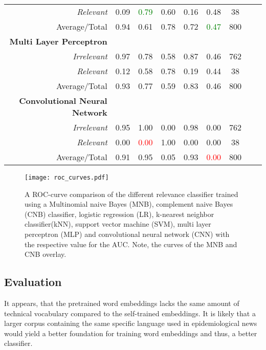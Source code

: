 \begin{table}
\begin{tabular}{@{}rcccccccc@{}}
      \textsl{Relevant}& 0.09& \textcolor{green}{0.79}&  0.60& 0.16& 0.48& 38 \\
      Average/Total& 0.94& 0.61& 0.78& 0.72& \textcolor{green}{0.47}& 800 \vspace{2mm}\\
      \textbf{Multi Layer Perceptron}\\
      \textsl{Irrelevant}& 0.97& 0.78&  0.58& 0.87& 0.46& 762 \\
      \textsl{Relevant}& 0.12& 0.58&  0.78& 0.19& 0.44& 38 \\
      Average/Total& 0.93& 0.77& 0.59& 0.83& 0.46& 800 \\
      \textbf{Convolutional Neural Network}\\
      \textsl{Irrelevant}& 0.95& 1.00&  0.00& 0.98& 0.00& 762 \\
      \textsl{Relevant}& 0.00& \textcolor{red}{0.00}&  1.00& 0.00& 0.00& 38 \\
      Average/Total& 0.91& 0.95& 0.05& 0.93& \textcolor{red}{0.00}& 800 \\
      \bottomrule
    \end{tabular}
  \label{table:recommender_performance}
  \end{table}

  \begin{figure}
    \centering
    \texttt{[image: roc\_curves.pdf]}
    \caption{A ROC-curve comparison of the different relevance classifier trained using a Multinomial naive Bayes (MNB), complement naive Bayes (CNB) classifier, logistic regression (LR), k-nearest neighbor classifier(kNN), support vector machine (SVM), multi layer perceptron (MLP) and convolutional neural network (CNN) with the respective value for the AUC. Note, the curves of the MNB and CNB overlay.}
  \label{fig:roc}
  \end{figure}

\subsection{Evaluation}
  It appears, that the pretrained word embeddings lacks the same amount of technical vocabulary compared to the self-trained embeddings.
  It is likely that a larger corpus containing the same specific language used in epidemiological news would yield a better foundation for training word embeddings and thus, a better classifier.

